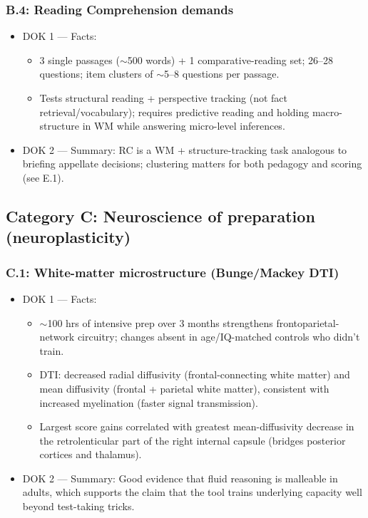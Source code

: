 \documentclass[11pt]{article}
\begin{document}
\subsubsection*{B.4: Reading Comprehension demands}
\begin{itemize}
\item DOK 1 --- Facts:
\begin{itemize}
\item 3 single passages ($\sim$500 words) + 1 comparative-reading set; 26--28 questions; item clusters of $\sim$5--8 questions per passage.
\item Tests structural reading + perspective tracking (not fact retrieval/vocabulary); requires predictive reading and holding macro-structure in WM while answering micro-level inferences.
\end{itemize}
\item DOK 2 --- Summary: RC is a WM + structure-tracking task analogous to briefing appellate decisions; clustering matters for both pedagogy and scoring (see E.1).
\end{itemize}

\subsection*{Category C: Neuroscience of preparation (neuroplasticity)}
\subsubsection*{C.1: White-matter microstructure (Bunge/Mackey DTI)}
\begin{itemize}
\item DOK 1 --- Facts:
\begin{itemize}
\item $\sim$100 hrs of intensive prep over 3 months strengthens frontoparietal-network circuitry; changes absent in age/IQ-matched controls who didn't train.
\item DTI: decreased radial diffusivity (frontal-connecting white matter) and mean diffusivity (frontal + parietal white matter), consistent with increased myelination (faster signal transmission).
\item Largest score gains correlated with greatest mean-diffusivity decrease in the retrolenticular part of the right internal capsule (bridges posterior cortices and thalamus).
\end{itemize}
\item DOK 2 --- Summary: Good evidence that fluid reasoning is malleable in adults, which supports the claim that the tool trains underlying capacity well beyond test-taking tricks.
\end{itemize}
\end{document}
